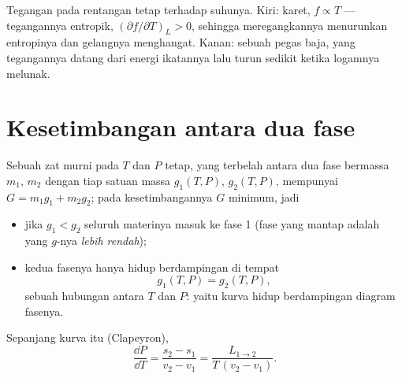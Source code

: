 \begin{omfigure}

{\small Tegangan pada rentangan tetap terhadap suhunya. Kiri: karet,
$f \propto T$ --- tegangannya entropik, $(\partial f/\partial T)_L > 0$,
sehingga meregangkannya menurunkan entropinya dan gelangnya menghangat. Kanan: sebuah pegas
baja, yang tegangannya datang dari energi ikatannya lalu turun sedikit
ketika logamnya melunak.}
\end{omfigure}

\section{Kesetimbangan antara dua fase}

\begin{theorem}\label{thm:b2:thermodynamic-potentials:coexistence}
Sebuah zat murni pada $T$ dan $P$ tetap, yang terbelah antara dua fase bermassa
$m_1$, $m_2$ dengan  tiap satuan massa $g_1(T,P)$,
$g_2(T,P)$, mempunyai $G = m_1g_1 + m_2g_2$; pada kesetimbangannya $G$ minimum, jadi
\begin{itemize}
\item jika $g_1 < g_2$ seluruh materinya masuk ke fase 1 (fase yang
      mantap adalah yang $g$-nya \emph{lebih rendah});
\item kedua fasenya hanya hidup berdampingan di tempat
      \[
      g_1(T,P) = g_2(T,P) ,
      \]
      sebuah hubungan antara $T$ dan $P$: yaitu kurva hidup berdampingan diagram
      fasenya.
\end{itemize}
Sepanjang kurva itu (Clapeyron),
\[
\frac{\dd P}{\dd T} = \frac{s_2 - s_1}{v_2 - v_1} = \frac{L_{1\to2}}{T\,(v_2 - v_1)} .
\]
\end{theorem}

